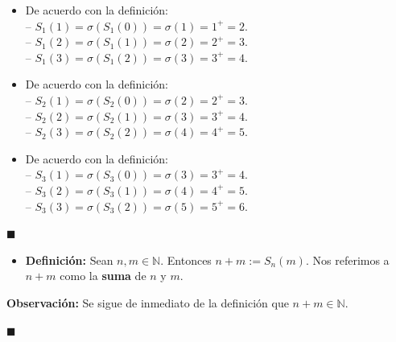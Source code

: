 \documentclass[10 pt]{article}
\begin{document}
\begin{itemize}
    \item \Large{De acuerdo con la definición: \\

    -- $S_1(1)=\sigma(S_1(0))=\sigma(1)=1^+=2$. \\

    -- $S_1(2)=\sigma(S_1(1))=\sigma(2)=2^+=3$. \\

    -- $S_1(3)=\sigma(S_1(2))=\sigma(3)=3^+=4$.} \\

    \item \Large{De acuerdo con la definición: \\

    -- $S_2(1)=\sigma(S_2(0))=\sigma(2)=2^+=3$. \\

    -- $S_2(2)=\sigma(S_2(1))=\sigma(3)=3^+=4$. \\

    -- $S_2(3)=\sigma(S_2(2))=\sigma(4)=4^+=5$.} \\

    \item \Large{De acuerdo con la definición: \\

    -- $S_3(1)=\sigma(S_3(0))=\sigma(3)=3^+=4$. \\

    -- $S_3(2)=\sigma(S_3(1))=\sigma(4)=4^+=5$. \\

    -- $S_3(3)=\sigma(S_3(2))=\sigma(5)=5^+=6$.} \\
\end{itemize}

\begin{flushright}
    $\blacksquare$
\end{flushright}

\begin{itemize}
    \item \Large{\textbf{Definición:} Sean $n,m \in \mathbb N$. Entonces $n+m:=S_n(m)$. Nos referimos a $n+m$ como la \textbf{suma} de $n$ y $m$.} \\ 
\end{itemize}

\Large{\textbf{Observación:} Se sigue de inmediato de la definición que $n+m \in \mathbb N$.} \\

\begin{flushright}
    $\blacksquare$
\end{flushright}
\end{document}
